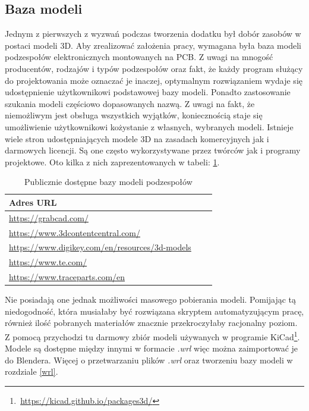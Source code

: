 \documentclass[brudnopis]{xmgr}
\begin{document}
\subsection{Baza modeli}

Jednym z pierwszych z wyzwań podczas tworzenia dodatku był dobór zasobów w postaci modeli 3D. Aby zrealizować założenia pracy, wymagana była baza modeli podzespołów elektronicznych montowanych na PCB. Z uwagi na mnogość producentów, rodzajów i typów podzespołów oraz fakt, że każdy program służący do projektowania może oznaczać je inaczej, optymalnym rozwiązaniem wydaje się udostępnienie użytkownikowi podstawowej bazy modeli. Ponadto zastosowanie szukania modeli częściowo dopasowanych nazwą. Z uwagi na fakt, że niemożliwym jest obsługa wszystkich wyjątków, koniecznością staje się umożliwienie użytkownikowi kożystanie z własnych, wybranych modeli. Istnieje wiele stron udostępniających modele 3D na zasadach komercyjnych jak i darmowych licencji. Są one często wykorzystywane przez twórców jak i programy projektowe. Oto kilka z nich zaprezentowanych w tabeli: \ref{fig:table}.

\begin{table}[htb]
\begin{tabular}{|l|l|l|} \hline
Adres URL \\ \hline
\url{https://grabcad.com/} \\ \hline
\url{https://www.3dcontentcentral.com/} \\ \hline
\url{https://www.digikey.com/en/resources/3d-models} \\ \hline
\url{https://www.te.com/} \\ \hline
\url{https://www.traceparts.com/en} \\ \hline
\end{tabular}
\caption{Publicznie dostępne bazy modeli podzespołów}
\label{fig:table}
\end{table}
Nie posiadają one jednak możliwości masowego pobierania modeli. Pomijając tą niedogodność, która musiałaby być rozwiązana skryptem automatyzującym pracę, również ilość pobranych materiałów znacznie przekroczyłaby racjonalny poziom. Z pomocą przychodzi tu darmowy zbiór modeli używanych w programie KiCad\footnote{\,\url{https://kicad.github.io/packages3d/}}. Modele są dostępne między innymi w formacie \emph{.wrl} więc można zaimportować je do Blendera. Więcej o przetwarzaniu plików \emph{.wrl} oraz tworzeniu bazy modeli w rozdziale \ref{wrl}.
\end{document}

